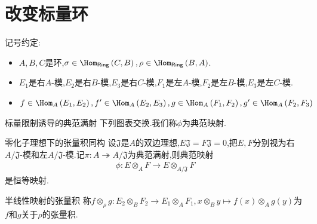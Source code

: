 \section{改变标量环}

记号约定:

\begin{itemize}
	\item $A,B,C$是环,$\sigma\in\Hom_{\mathsf{Ring}}\left(C,B\right),\rho\in\Hom_{\mathsf{Ring}}\left(B,A\right)$.
	\item $E_{1}$是右$A$-模,$E_{2}$是右$B$-模,$E_{3}$是右$C$-模,$F_{1}$是左$A$-模,$F_{2}$是左$B$-模,$E_{3}$是左$C$-模.
	\item $f\in\Hom_{A}\left(E_{1},E_{2}\right),f^{\prime}\in\Hom_{A}\left(E_{2},E_{3}\right),g\in\Hom_{A}\left(F_{1},F_{2}\right),g^{\prime}\in\Hom_{A}\left(F_{2},F_{3}\right)$
\end{itemize}

\begin{proposition}{标量限制诱导的典范满射}{}
	下列图表交换.我们称$\phi$为典范映射.
	\begin{center}
	\end{center}
\end{proposition}

\begin{corollary}{零化子理想下的张量积同构}{}
	设$\mathfrak{J}$是$A$的双边理想,$E\mathfrak{J}=F\mathfrak{J}=0$,把$E,F$分别视为右$A/\mathfrak{J}$-模和左$A/\mathfrak{J}$-模.记$\pi:A\twoheadrightarrow A/\mathfrak{J}$为典范满射,则典范映射
	\begin{align*}
		\phi:E\otimes_{A}F\to E\otimes_{A/\mathfrak{J}}F
	\end{align*}
	是恒等映射.
\end{corollary}

\begin{definition}{半线性映射的张量积}{}
	称$f\otimes_{\rho}g:E_{2}\otimes_{B}F_{2}\to E_{1}\otimes_{A}F_{1},x\otimes_{B}y\mapsto f\left(x\right)\otimes_{A}g\left(y\right)$为$f$和$g$关于$\rho$的张量积.
\end{definition}

